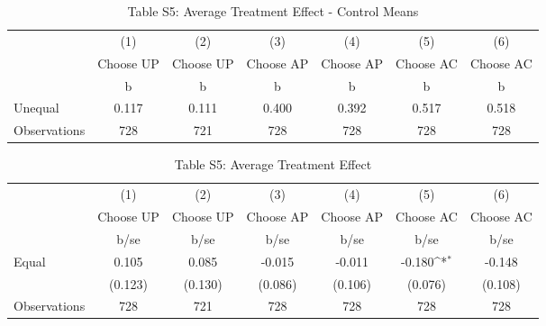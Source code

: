 \begin{table}[htbp]\centering
\def\sym#1{\ifmmode^{#1}\else\(^{#1}\)\fi}
\caption{Table S5: Average Treatment Effect - Control Means}
\begin{tabular}{l*{6}{c}}
\hline\hline
                    &\multicolumn{1}{c}{(1)}&\multicolumn{1}{c}{(2)}&\multicolumn{1}{c}{(3)}&\multicolumn{1}{c}{(4)}&\multicolumn{1}{c}{(5)}&\multicolumn{1}{c}{(6)}\\
                    &\multicolumn{1}{c}{Choose UP}&\multicolumn{1}{c}{Choose UP}&\multicolumn{1}{c}{Choose AP}&\multicolumn{1}{c}{Choose AP}&\multicolumn{1}{c}{Choose AC}&\multicolumn{1}{c}{Choose AC}\\
                    &           b&           b&           b&           b&           b&           b\\
\hline
Unequal             &       0.117&       0.111&       0.400&       0.392&       0.517&       0.518\\
\hline
Observations        &         728&         721&         728&         728&         728&         728\\
\hline\hline
\end{tabular}
\end{table}
\begin{table}[htbp]\centering
\def\sym#1{\ifmmode^{#1}\else\(^{#1}\)\fi}
\caption{Table S5: Average Treatment Effect}
\begin{tabular}{l*{6}{c}}
\hline\hline
                    &\multicolumn{1}{c}{(1)}&\multicolumn{1}{c}{(2)}&\multicolumn{1}{c}{(3)}&\multicolumn{1}{c}{(4)}&\multicolumn{1}{c}{(5)}&\multicolumn{1}{c}{(6)}\\
                    &\multicolumn{1}{c}{Choose UP}&\multicolumn{1}{c}{Choose UP}&\multicolumn{1}{c}{Choose AP}&\multicolumn{1}{c}{Choose AP}&\multicolumn{1}{c}{Choose AC}&\multicolumn{1}{c}{Choose AC}\\
                    &        b/se         &        b/se         &        b/se         &        b/se         &        b/se         &        b/se         \\
\hline
Equal               &       0.105         &       0.085         &      -0.015         &      -0.011         &      -0.180\sym{*}  &      -0.148         \\
                    &     (0.123)         &     (0.130)         &     (0.086)         &     (0.106)         &     (0.076)         &     (0.108)         \\
\hline
Observations        &         728         &         721         &         728         &         728         &         728         &         728         \\
\hline\hline
\end{tabular}
\end{table}
